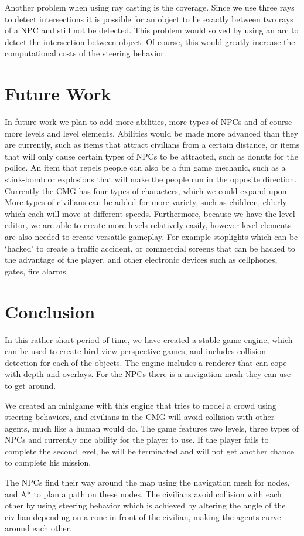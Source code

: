 \documentclass[a4paper,pdf,12pt]{article}
\begin{document}
Another problem when using ray casting is the coverage. Since we use three rays to detect intersections it is possible for an object to lie exactly between two rays of a NPC and still not be detected. This problem would solved by using an arc to detect the intersection between object. Of course, this would greatly increase the computational costs of the steering behavior.

\section{Future Work}
\label{sec:Future Work}
In future work we plan to add more abilities, more types of NPCs and of course more levels and level elements. Abilities would be made more advanced than they are currently, such as items that attract civilians from a certain distance, or items that will only cause certain types of NPCs to be attracted, such as donuts for the police. An item that repels people can also be a fun game mechanic, such as a stink-bomb or explosions that will make the people run in the opposite direction. Currently the CMG has four types of characters, which we could expand upon. More types of civilians can be added for more variety, such as children, elderly which each will move at different speeds. Furthermore, because we have the level editor, we are able to create more levels relatively easily, however level elements are also needed to create versatile gameplay. For example stoplights which can be `hacked' to create a traffic accident, or commercial screens that can be hacked to the advantage of the player, and other electronic devices such as cellphones, gates, fire alarms.

\section{Conclusion}
\label{sec:Conclusion}

In this rather short period of time, we have created a stable game engine, which can be used to create bird-view perspective games, and includes collision detection for each of the objects. The engine includes a renderer that can cope with depth and overlays. For the NPCs there is a navigation mesh they can use to get around. 

We created an minigame with this engine that tries to model a crowd using steering behaviors, and civilians in the CMG will avoid collision with other agents, much like a human would do. The game features two levels, three types of NPCs and currently one ability for the player to use. If the player fails to complete the second level, he will be terminated and will not get another chance to complete his mission.

The NPCs find their way around the map using the navigation mesh for nodes, and A* to plan a path on these nodes. The civilians avoid collision with each other by using steering behavior which is achieved by altering the angle of the civilian depending on a cone in front of the civilian, making the agents curve around each other.




\end{document}
